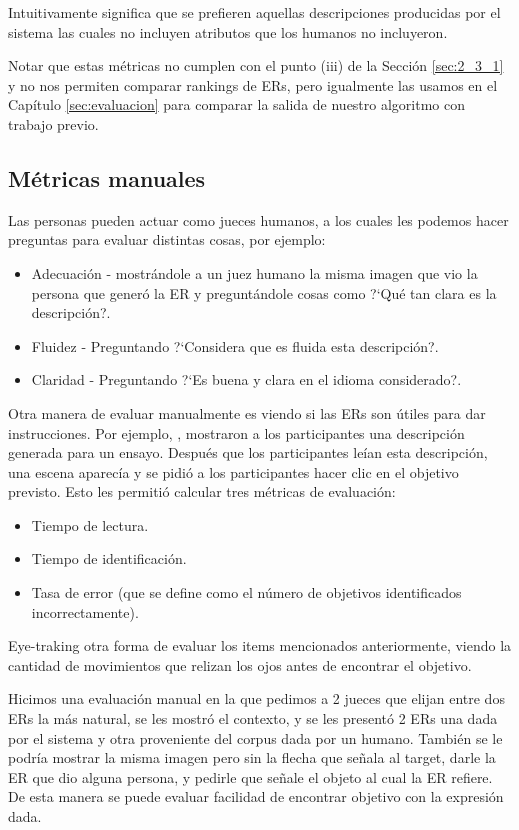 Intuitivamente significa que se prefieren aquellas descripciones producidas por el sistema las cuales no incluyen atributos que los humanos no incluyeron.

Notar que estas m\'etricas no cumplen con el punto (iii) de la Secci\'on \ref{sec:2_3_1} y no nos permiten comparar rankings de ERs, pero igualmente las usamos en el Cap\'itulo \ref{sec:evaluacion} para comparar la salida de nuestro algoritmo con trabajo previo.

\subsection{M\'etricas manuales}

Las personas pueden actuar como jueces humanos, a los cuales les podemos hacer preguntas para evaluar distintas cosas, por ejemplo:
\begin{itemize}
\item Adecuaci\'on - mostr\'andole a un juez humano la misma imagen que vio la persona que gener\'o la ER y pregunt\'andole cosas como ?`Qu\'e tan clara es la descripci\'on?.
\item Fluidez - Preguntando ?`Considera que es fluida esta descripci\'on?.
\item Claridad - Preguntando ?`Es buena y clara en el idioma considerado?.
\end{itemize}

Otra manera de evaluar manualmente es viendo si las ERs son \'utiles para dar instrucciones. Por ejemplo, \cite{BelzGattEvaluation}, 
mostraron a los participantes una descripci\'on generada para un ensayo. Despu\'es que los participantes le\'ian esta descripci\'on, 
una escena aparec\'ia y se pidi\'o a los participantes
hacer clic en el objetivo previsto. Esto les permiti\'o calcular tres m\'etricas de evaluaci\'on: %

\begin{itemize}
\item Tiempo de lectura.
\item Tiempo de identificaci\'on.
\item Tasa de error (que se define como el n\'umero de objetivos identificados incorrectamente).
\end{itemize}

Eye-traking otra forma de evaluar los items mencionados anteriormente, viendo la cantidad de movimientos que relizan los ojos antes de encontrar el objetivo.

Hicimos una evaluaci\'on manual en la que pedimos a 2 jueces que elijan entre dos ERs la m\'as natural, se les mostr\'o el contexto, 
y se les present\'o 2 ERs una dada por el sistema y otra proveniente del corpus dada por un humano. Tambi\'en se le podr\'ia mostrar 
la misma imagen pero sin la flecha que se\~nala al target, darle la ER que dio alguna persona, y pedirle que se\~nale el objeto al cual 
la ER refiere. De esta manera se puede evaluar facilidad de encontrar objetivo con la expresi\'on dada.

